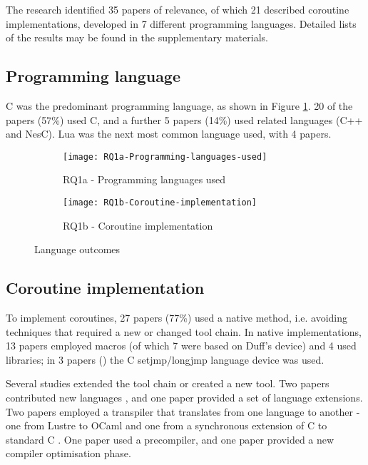 The research identified 35 papers of relevance, of which 21 described coroutine implementations, developed in 7 different programming languages. Detailed lists of the results may be found in the supplementary materials.

\subsection{Programming language}

C was the predominant programming language, as shown in Figure \ref{fig:rq1a}. 20 of the papers (57\%) used C, and a further 5 papers (14\%) used related languages (C++ and NesC). Lua was the next most common language used, with 4 papers.

\begin{figure}[h]
	\centering
	\begin{subfigure}[h]{0.48\textwidth}
		\centering
		\texttt{[image: RQ1a-Programming-languages-used]}
		\caption{RQ1a - Programming languages used}
		\label{fig:rq1a}
	\end{subfigure}
	\begin{subfigure}[h]{0.46\textwidth}
		\centering
		\texttt{[image: RQ1b-Coroutine-implementation]}
		\caption{RQ1b - Coroutine implementation}
		\label{fig:rq1b}
	\end{subfigure}
	\caption{Language outcomes}
\end{figure}

\subsection{Coroutine implementation}

To implement coroutines, 27 papers (77\%) used a native method, i.e. avoiding techniques that required a new or changed tool chain. In native implementations, 13 papers employed macros (of which 7 were based on Duff's device) and 4 used libraries; in 3 papers (\cite{Yu2008, Cohen2007b, Kalebe2017}) the C setjmp/longjmp language device was used.

Several studies extended the tool chain or created a new tool. Two papers contributed new languages \cite{Jahier2016, Evers2007}, and one paper \cite{Niebert2014} provided a set of language extensions. Two papers employed a transpiler that translates from one language to another - one from Lustre to OCaml \cite{Jahier2016} and one from a synchronous extension of C to standard C \cite{Karpin2007}. One paper \cite{Fritzsche2010} used a precompiler, and one paper \cite{Jaaskelainen2008} provided a new compiler optimisation phase.

